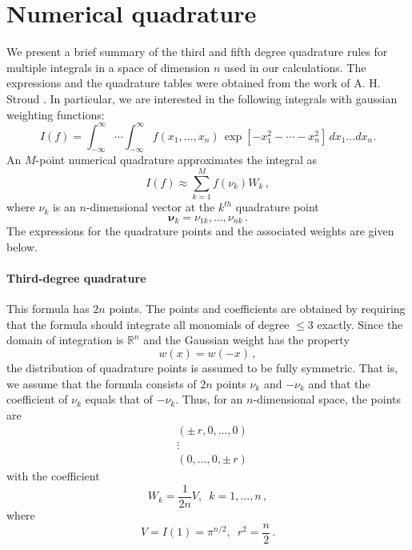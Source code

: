 \documentclass{article}
\begin{document}
\section{Numerical quadrature}
\label{sec:Numerical quadrature}

We present a brief summary of the third and fifth degree quadrature rules for multiple integrals in a space of dimension $n$ used in our calculations. The expressions and the quadrature tables were obtained from the work of A. H. Stroud \cite{stroud1971approximate}. In particular, we are interested in the following integrals with gaussian weighting functions:
\begin{equation}\label{Integral}
    I(f)
    =
    \int_{-\infty}^\infty
    \cdots
    \int_{-\infty}^\infty
    f(x_1,\dots,x_n)
    \,\exp[-x_1^2 - \cdots - x_n^2]
    \, dx_1\dots dx_n .
\end{equation}
An $M$-point numerical quadrature approximates the integral as
\begin{equation}\label{Approximation}
    I(f) \approx \sum_{k=1}^M f(\nu_k)W_k \,,
\end{equation}
where $\nu_k$ is an $n$-dimensional vector at the $k^{th}$ quadrature point
\begin{equation}
    \mathbf{\nu}_k = {\nu_{1k},\ldots, \nu_{nk}} \,.
\end{equation}
The expressions for the quadrature points and the associated weights are given below.

\paragraph{Third-degree quadrature} This formula has $2n$ points. The points and coefficients are obtained by requiring that the formula should integrate all monomials of degree $\leq 3$ exactly. Since the domain of integration is $\mathbb{R}^n$ and the Gaussian weight has the property
\begin{equation}
\label{eq:gauss-function-symmetry}
    w(x) = w(-x) \,,
\end{equation}
the distribution of quadrature points is assumed to be fully symmetric. That is, we assume that the formula consists of $2n$ points $\nu_k$ and $-\nu_k$ and that the coefficient of $\nu_k$ equals that of $-\nu_k$. Thus, for an $n$-dimensional space, the points are
\begin{subequations}
\begin{align}
    & (\pm\, r,0, \ldots, 0) \nonumber\\
    & \vdots \nonumber \\
    & (0,\ldots, 0, \pm\, r) \nonumber
\end{align}
\end{subequations}
with the coefficient
\begin{equation}
    W_k = \frac{1}{2n}V,\,\,\, k = 1, \ldots, n \,,
\end{equation}
where
\begin{equation}
    V = I(1) = \pi^{n/2},\,\,\,r^2 = \frac{n}{2}\,.
\end{equation}
\end{document}
